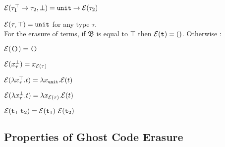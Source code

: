 $ \mathcal{E}(\tau_{1}^{\top} \rightarrow \tau_{2}, \bot) 
	= \texttt{unit} \rightarrow \mathcal{E}(\tau_{2}) $ 

$ \mathcal{E}(\tau, \top) = \texttt{unit} $ for any type $\tau$. \\


\noindent For the erasure of terms,  if $\mathfrak{B}$ is equal to $\top$ then $\mathcal{E}(\texttt{t}) = ()$. Otherwise : 

  $\mathcal{E}(\texttt{()}) = \texttt{()}$
  
  $\mathcal{E}(x_{\tau}^{\bot}) = x_{\mathcal{E}(\tau)}$ 
  
  $\mathcal{E}(\lambda x_{\tau}^{\top}.t) = \lambda x_{\texttt{unit}}. \mathcal{E}(t)$
  
  $\mathcal{E}(\lambda x_{\tau}^{\bot}.t) = \lambda x_{\mathcal{E}(\tau)}. \mathcal{E}(t)$  
  
  $\mathcal{E}(\texttt{t}_{1} ~ \texttt{t}_{2}) = \mathcal{E}(\texttt{t}_{1})  ~ \mathcal{E}(\texttt{t}_{2})$

\subsection{Properties of Ghost Code Erasure}
